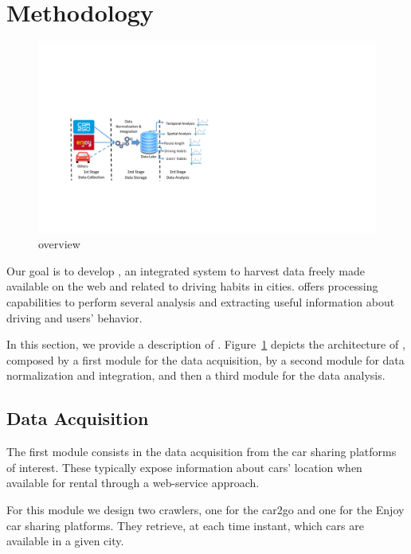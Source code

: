 \section{Methodology}
\label{sec:methodology}


\begin{figure}[h!]
\centering
 \includegraphics[trim=3cm 4.5cm 17cm 7.2cm,clip, width=0.95\columnwidth]{figures/framework_schema.pdf}
 \caption{\tool overview\label{fig:framework}}
\end{figure}



Our goal is to develop \tool, an integrated system to harvest data freely made available on the web and related to driving habits in cities. \tool offers processing capabilities to perform several analysis and extracting useful information about driving and users' behavior.


In this section, we provide a description of \tool. Figure~\ref{fig:framework} depicts the architecture of \tool, composed by a first module for the data acquisition, by a second module for data normalization and integration, and then a third  module for the data analysis.


\subsection{Data Acquisition}

The first module consists in the data acquisition from the car sharing platforms of interest. These typically expose information about cars' location when available for rental through a web-service approach. 

For this module we design two crawlers, one for the car2go and one for the Enjoy car sharing platforms. They retrieve, at each time instant, which cars are available in a given city.

